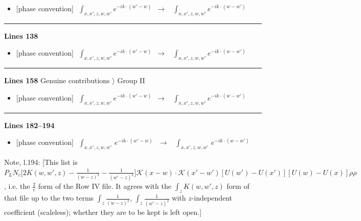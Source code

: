 \documentclass[10pt]{article}
\newenvironment{notebox}{\def\FrameCommand{{\color{notebar}\vrule width 1.5pt}\hspace{6pt}}\MakeFramed{\advance\hsize-\width\FrameRestore}\small}{\endMakeFramed}
\begin{document}
\begin{itemize}[leftmargin=2.2em,itemsep=1pt,topsep=2pt]
\item[\textbf{l.112}] \textsf{\small [phase convention]} $\displaystyle \,\,\int_{x,x',z,w,w'}e^{-ik\cdot(w'-w)}$\ $\longrightarrow$\ $\displaystyle \,\,\int_{x,x',z,w,w'}e^{-ik\cdot(w-w')}$
\end{itemize}
\noindent\rule{\linewidth}{0.3pt}\par\noindent\textbf{Lines 138} \par
\begin{itemize}[leftmargin=2.2em,itemsep=1pt,topsep=2pt]
\item[\textbf{l.138}] \textsf{\small [phase convention]} $\displaystyle \,\,\int_{x,x',z,w,w'}e^{-ik\cdot(w'-w)}$\ $\longrightarrow$\ $\displaystyle \,\,\int_{x,x',z,w,w'}e^{-ik\cdot(w-w')}$
\end{itemize}
\noindent\rule{\linewidth}{0.3pt}\par\noindent\textbf{Lines 158} \quad \textsf{Genuine contributions $\rangle$ Group II} \par
\begin{itemize}[leftmargin=2.2em,itemsep=1pt,topsep=2pt]
\item[\textbf{l.158}] \textsf{\small [phase convention]} $\displaystyle \,\,\int_{x,x',z,w,w'}e^{-ik\cdot(w'-w)}$\ $\longrightarrow$\ $\displaystyle \,\,\int_{x,x',z,w,w'}e^{-ik\cdot(w-w')}$
\end{itemize}
\noindent\rule{\linewidth}{0.3pt}\par\noindent\textbf{Lines 182--194} \par
\begin{itemize}[leftmargin=2.2em,itemsep=1pt,topsep=2pt]
\item[\textbf{l.182}] \textsf{\small [phase convention]} $\displaystyle \,\,\int_{x,x',z,w,w'}\,e^{-ik\cdot(w'-w)}\,$\ $\longrightarrow$\ $\displaystyle \,\,\int_{x,x',z,w,w'}\,e^{-ik\cdot(w-w')}\,$
\end{itemize}
\begin{notebox}\textsf{\small Note, l.194:} [This list is $P_{L}N_{c}\big[2K(w,w',z)-\frac{1}{(w-z)^{2}}-\frac{1}{(w'-z)^{2}}\big]\mathcal{K}(x-w)\cdot\mathcal{K}(x'-w')[U(w')-U(x')][U(w)-U(x)]\rho\rho$, i.e. the $\frac{2}{\epsilon}$ form of the Row IV file. It agrees with the $\int_{z}K(w,w',z)$ form of that file up to the two terms $\int_{z}\frac{1}{(w-z)^{2}}$, $\int_{z}\frac{1}{(w'-z)^{2}}$ with $z$-independent coefficient (scaleless); whether they are to be kept is left open.]\end{notebox}
\end{document}
